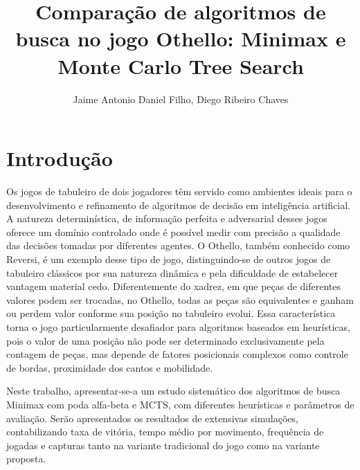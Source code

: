 \documentclass[12pt]{article}
\title{Comparação de algoritmos de busca no jogo Othello: Minimax e Monte Carlo Tree Search}
\author{Jaime Antonio Daniel Filho\inst{1}, Diego Ribeiro Chaves\inst{1}}
\begin{document}
 

\maketitle

\section{Introdução}
 
Os jogos de tabuleiro de dois jogadores
têm servido como ambientes ideais para o
desenvolvimento e refinamento de algoritmos de decisão em inteligência artificial.
A natureza determinística, de informação perfeita e adversarial
desses jogos oferece um domínio controlado onde é possível medir com precisão a qualidade das
decisões tomadas por diferentes agentes. O Othello, também conhecido como Reversi, é um exemplo
desse tipo de jogo, distinguindo-se de outros jogos de tabuleiro clássicos
por sua natureza dinâmica e pela dificuldade de estabelecer vantagem material cedo.
Diferentemente do xadrez, em que peças de diferentes valores podem ser trocadas, no Othello, todas
as peças são equivalentes e ganham ou perdem valor conforme sua posição no tabuleiro evolui.
Essa característica torna o jogo particularmente desafiador para algoritmos baseados em
heurísticas, pois o valor de uma posição não pode ser determinado exclusivamente pela contagem
de peças, mas depende de fatores posicionais complexos como controle de bordas, proximidade
dos cantos e mobilidade.

Neste trabalho, apresentar-se-a um estudo sistemático dos algoritmos de busca Minimax com poda alfa-beta e MCTS, com diferentes heurísticas e parâmetros de avaliação. Serão apresentados os resultados de extensivas simulações, contabilizando taxa de vitória, tempo médio por movimento, frequência de jogadas e capturas tanto na variante tradicional do jogo como na variante proposta.
 
 
\end{document}
